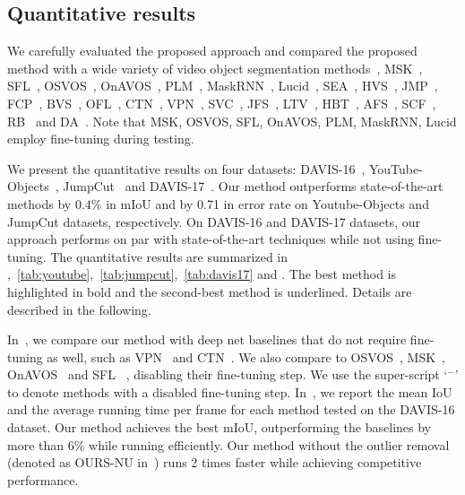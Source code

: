 \subsection{Quantitative results}

We carefully evaluated the proposed approach and compared the proposed method with a wide variety of video object segmentation methods~\ie, MSK~\cite{PerazziCVPR17}, SFL~\cite{ChenICCV17}, OSVOS~\cite{caelles2016one}, OnAVOS~\cite{voigtlaender2017online}, PLM~\cite{yoon2017pixel}, MaskRNN~\cite{hu2017maskrnn}, Lucid~\cite{khoreva2017lucid}, SEA~\cite{AvinashCVPR14}, HVS~\cite{GrundmannCVPR2010}, JMP~\cite{FanTOG15}, FCP~\cite{PerazziICCV15}, BVS~\cite{MaerkiCVPR16}, OFL~\cite{TsaiCVPR2016}, CTN~\cite{JangCVPR17}, VPN~\cite{JampaniCVPR17}, 
SVC~\cite{WangTIP2017}, JFS~\cite{NagarajaICCV15}, LTV~\cite{OchsPAMI2014}, HBT~\cite{GodecICCV2011}, AFS~\cite{VijayanarasimhanECCV2012}, SCF~\cite{JainECCV2014}, RB~\cite{BaiSIGGRAPH2009} and DA~\cite{ZhongTOG12}. Note that MSK, OSVOS, SFL, OnAVOS, PLM, MaskRNN, Lucid employ fine-tuning during testing.

We present the quantitative results on four datasets: DAVIS-16~\cite{PerazziCVPR16}, YouTube-Objects~\cite{PrestCVPR12}, JumpCut~\cite{FanTOG15} and DAVIS-17~\cite{pont2017DAVIS}. Our method outperforms state-of-the-art methods by $0.4\%$ in mIoU and by 0.71 in error rate on Youtube-Objects and JumpCut datasets, respectively. On DAVIS-16 and DAVIS-17 datasets, our approach performs on par with state-of-the-art techniques while not using fine-tuning. The quantitative results are summarized in ,~\ref{tab:youtube},~\ref{tab:jumpcut},~\ref{tab:davis17} and . The best method is highlighted in bold and the second-best method is underlined. Details are described in the following.

In~, we compare our method with deep net baselines that do not require fine-tuning as well, such as VPN~\cite{JampaniCVPR17} and CTN~\cite{JangCVPR17}. We also compare to OSVOS~\cite{caelles2016one}, MSK~\cite{PerazziCVPR17}, OnAVOS~\cite{voigtlaender2017online} and SFL ~\cite{ChenICCV17}, disabling their fine-tuning step. We use the super-script `$^-$' to denote methods with a disabled fine-tuning step. In~, we report the mean IoU and the average running time per frame for each method tested on the DAVIS-16 dataset. Our method achieves the best mIoU, outperforming the baselines by more than 6\% while running efficiently. Our method without the outlier removal (denoted as OURS-NU in~) runs 2 times faster while achieving competitive performance.

